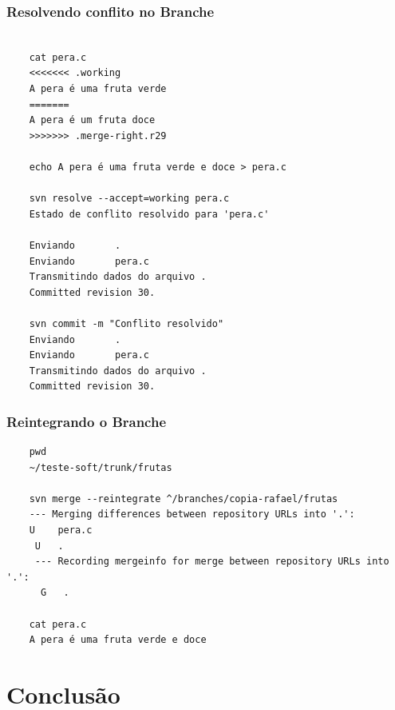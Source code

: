 \documentclass{beamer}
\begin{document}
\begin{frame}[fragile]
    \frametitle{Resolvendo conflito no Branche}

    \begin{bash}{}
        {\tiny
            \begin{verbatim}

    cat pera.c
    <<<<<<< .working
    A pera é uma fruta verde
    =======
    A pera é um fruta doce
    >>>>>>> .merge-right.r29

    echo A pera é uma fruta verde e doce > pera.c

    svn resolve --accept=working pera.c
    Estado de conflito resolvido para 'pera.c'

    Enviando       .
    Enviando       pera.c
    Transmitindo dados do arquivo .
    Committed revision 30.

    svn commit -m "Conflito resolvido"
    Enviando       .
    Enviando       pera.c
    Transmitindo dados do arquivo .
    Committed revision 30.
    \end{verbatim}
}
    \end{bash}

\end{frame}
\begin{frame}[fragile]
    \frametitle{Reintegrando o Branche}

    \begin{bash}{}
        {\tiny
            \begin{verbatim}
    pwd
    ~/teste-soft/trunk/frutas

    svn merge --reintegrate ^/branches/copia-rafael/frutas
    --- Merging differences between repository URLs into '.':
    U    pera.c
     U   .
     --- Recording mergeinfo for merge between repository URLs into '.':
      G   .

    cat pera.c
    A pera é uma fruta verde e doce
    \end{verbatim}
}
    \end{bash}

\end{frame}
\section{Conclus\~ao}
\end{document}
